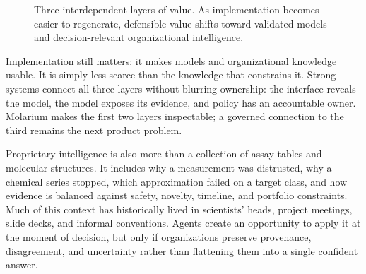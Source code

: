 \documentclass[10pt]{article}
\begin{document}
\begin{figure}[htbp]
  \centering
  \caption{Three interdependent layers of value. As implementation becomes easier to regenerate, defensible value shifts toward validated models and decision-relevant organizational intelligence.}
  \label{fig:value-layers}
\end{figure}

Implementation still matters: it makes models and organizational knowledge usable.
It is simply less scarce than the knowledge that constrains it.
Strong systems connect all three layers without blurring ownership: the interface reveals the model, the model exposes its evidence, and policy has an accountable owner.
Molarium makes the first two layers inspectable; a governed connection to the third remains the next product problem.

Proprietary intelligence is also more than a collection of assay tables and molecular structures.
It includes why a measurement was distrusted, why a chemical series stopped, which approximation failed on a target class, and how evidence is balanced against safety, novelty, timeline, and portfolio constraints.
Much of this context has historically lived in scientists' heads, project meetings, slide decks, and informal conventions.
Agents create an opportunity to apply it at the moment of decision, but only if organizations preserve provenance, disagreement, and uncertainty rather than flattening them into a single confident answer.
\end{document}
